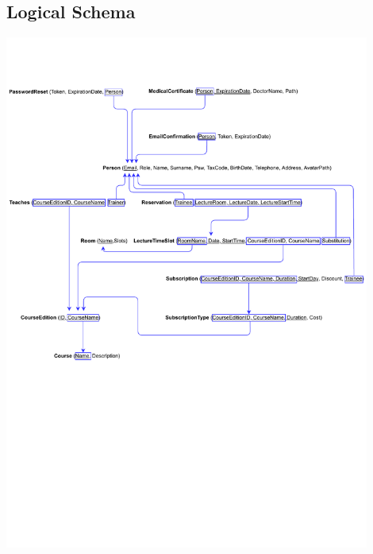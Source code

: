 \subsection{Logical Schema}
    \begin{center}
		\includegraphics[width=0.9\textwidth,bb = 0 380 700 850,clip=true]{resources/Logical_Schema.pdf}
    \end{center}

    
	